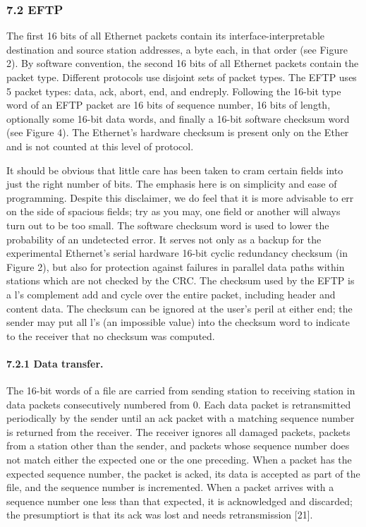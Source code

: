 \vspace{-8pt} 

\subsubsection{7.2 EFTP}
\vspace{-6pt} 
The first 16 bits of all Ethernet packets contain its interface-interpretable destination and source station addresses, a byte each, in that order (see Figure 2). By software convention, the second 16 bits of all Ethernet packets contain the packet type. Different protocols use disjoint sets of packet types. The EFTP uses 5 packet types: data, ack, abort, end, and endreply. Following the 16-bit type word of an EFTP packet are 16 bits of sequence number, 16 bits of length, optionally some 16-bit data words, and finally a 16-bit software checksum word (see Figure 4). The Ethernet's hardware checksum is present only on the Ether and is not counted at this level of protocol.

It should be obvious that little care has been taken to cram certain fields into just the right number of bits. The emphasis here is on simplicity and ease of programming. Despite this disclaimer, we do feel that it is more advisable to err on the side of spacious fields; try as you may, one field or another will always turn out to be too small.
The software checksum word is used to lower the probability of an undetected error. It serves not only as a backup for the experimental Ethernet's serial hardware 16-bit cyclic redundancy checksum (in Figure 2), but also for protection against failures in parallel data paths within stations which are not checked by the CRC. The checksum used by the EFTP is a l's complement add and cycle over the entire packet, including header and content data. The checksum can be ignored at the user's peril at either end; the sender may put all l's (an impossible value) into the checksum word to indicate to the receiver that no checksum was computed.

\vspace{-3pt} 

\paragraph{7.2.1 Data transfer.}
\vspace{-6pt} 

 The 16-bit words of a file are carried from sending station to receiving station in data packets consecutively numbered from 0. Each data packet is retransmitted periodically by the sender until an ack packet with a matching sequence number is returned from the receiver. The receiver ignores all damaged packets, packets from a station other than the sender, and packets whose sequence number does not match either the expected one or the one preceding. When a packet has the expected sequence number, the packet is acked, its data is accepted as part of the file, and the sequence number is incremented. When a packet arrives with a sequence number one less than that expected, it is acknowledged and discarded; the presumptiort is that its ack was lost and needs retransmission [21].

